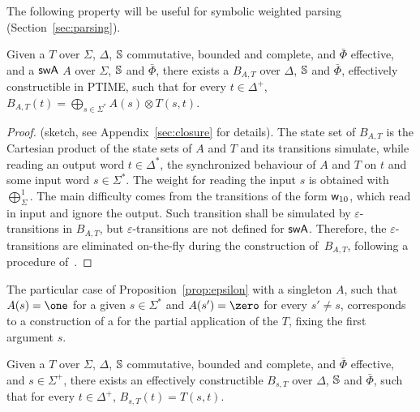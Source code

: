


\noindent
The following property will be useful for
symbolic weighted parsing (Section~\ref{sec:parsing}).

\begin{proposition} \label{prop:epsilon}
Given a \SWT $T$ over $\Sigma$, $\Delta$,
$\mathbb{S}$ commutative, bounded and complete,
and $\bar\Phi$ effective,
and a $\textsf{swA}$ $A$ over $\Sigma$, $\mathbb{S}$ and $\bar\Phi$,
there exists a \SWA $B_{A, T}$ over $\Delta$, $\mathbb{S}$ and $\bar\Phi$,
effectively constructible in PTIME, 
such that for every $t \in \Delta^+$,
$B_{A, T}(t) = \displaystyle\bigoplus_{s\in \Sigma^*} A(s) \otimes T(s, t)$.
\end{proposition}
%
\begin{proof}
(sketch, see Appendix~\ref{sec:closure} for details).
The state set of $B_{A, T}$ is the Cartesian product of
the state sets of $A$ and $T$ and its transitions simulate,
while reading an output word $t \in \Delta^*$, the
synchronized behaviour of $A$ and $T$ on $t$
and some input word $s \in \Sigma^*$.
The weight for reading the input $s$ is obtained with
$\bigoplus^1_\Sigma$.
%
The main difficulty comes from the transitions
of the form $\mathsf{w}_{10}$, which read in input and ignore the output.
Such transition shall be simulated by $\varepsilon$-transitions in $B_{A, T}$,
but $\varepsilon$-transitions are not defined for $\textsf{swA}$.
Therefore, the $\varepsilon$-transitions
are eliminated on-the-fly during the construction of~$B_{A, T}$,
following a procedure of~\cite{LombardySakarovitch12ciaa}.
\end{proof}

%
The particular case of Proposition~\ref{prop:epsilon} with a singleton $A$,
\ie such that $A(s) = \one$ for a given $s \in \Sigma^*$
and $A(s') = \zero$ for every $s' \neq s$,
corresponds to a construction of a \SWA for the partial application of the \SWT $T$,
fixing the first argument $s$.
\begin{corollary} \label{cor:epsilon}
Given a \SWT $T$ over $\Sigma$, $\Delta$,
$\mathbb{S}$ commutative, bounded and complete,
and $\bar\Phi$ effective,
and $s \in \Sigma^+$,
there exists an effectively constructible \SWA
$B_{s, T}$ over $\Delta$, $\mathbb{S}$ and $\bar\Phi$,
such that for every $t \in \Delta^+$, $B_{s, T}(t) = T(s, t)$.
\end{corollary}


